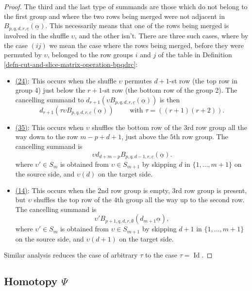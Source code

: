 \documentclass[12pt,a4paper,reqno]{amsart}
\DeclareMathOperator{\id}{Id}
\begin{document}
\begin{proof}
The third and the last type of summands are those which do not belong
to the first group and where the two rows being merged were not adjacent in 
$B_{p,q,d,r,\underline{c}}(\underline{\alpha})$. This necessarily
means that one of the rows being merged is involved in the shuffle $\upsilon$, 
and the other isn't. There are three such cases, where by the case
$(ij)$ we mean the case where the rows being merged, before
they were permuted by $\upsilon$, belonged to the row
groups $i$ and $j$ of the table in 
Definition \ref{defn-cut-and-slice-matrix-operation-bpqdrc}:
\begin{itemize}
\item \underline{(24)}: This occurs when the shuffle $\upsilon$
permutes $d+1$-st row (the top row in group 4) just below the $r+1$-st
row (the bottom row of the group 2). The cancelling summand to
$d_{r+1} \left(\upsilon B_{p,q,d,r,\underline{c}}(\underline{\alpha})\right)$
is then 
$$ d_{r+1} \left(\tau \upsilon
B_{p,q,d,r,\underline{c}}(\underline{\alpha})\right) \quad \quad
\text{ with } \tau = ((r+1)(r+2)).$$
\item \underline{(35)}: This occurs when $\upsilon$ shuffles the
bottom row of the 3rd row group all the way down to the row $m-p+d+1$, 
just above the $5$th row group.  The cancelling summand is 
$$ \upsilon d_{d + m - p} B_{p,q,d-1,r,\underline{c}}(\underline{\alpha}). $$
where $\upsilon' \in S_m$ is obtained from $\upsilon \in S_{m+1}$ by
skipping $d$ in $\{1, \dots, m+1\}$ on the source side, and 
$\upsilon(d)$ on the target side.
\item \underline{(14)}: This occurs when the 2nd row group is empty, 
3rd row group is present, but $\upsilon$ shuffles the top row of the
$4$th group all the way up to the second row. 
The cancelling summand is 
$$ \upsilon' B_{p+1, q, d, r, \emptyset}(d_{m+1}\underline{\alpha}), $$
where $\upsilon' \in S_m$ is obtained from $\upsilon \in S_{m+1}$ by
skipping $d+1$ in $\{1, \dots, m+1\}$ on the source side, and 
$\upsilon(d+1)$ on the target side. 
\end{itemize}

Similar analysis reduces the case of arbitrary $\tau$ to the case 
$\tau = \id$.  
\end{proof}

\subsection{Homotopy $\Psi$}
\end{document}
